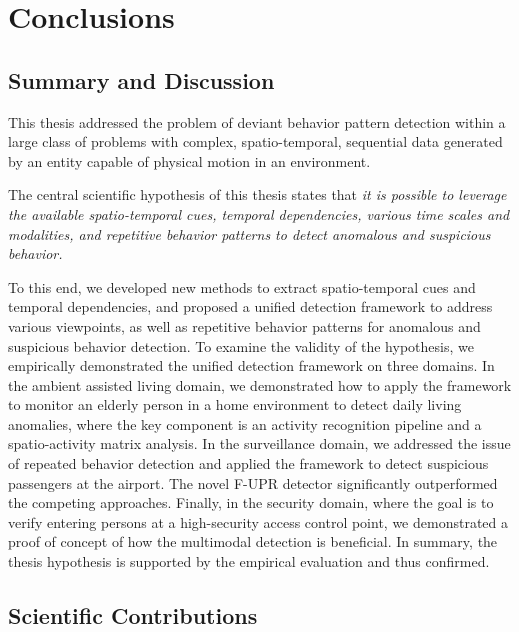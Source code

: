 
\chapter{Conclusions}
\label{chap:conclusions}

\section{Summary and Discussion}
This thesis addressed the problem of deviant behavior pattern detection within a large class of problems with complex, spatio-temporal, sequential data generated by an entity capable of physical motion in an environment.

The central scientific hypothesis of this thesis states that \textit{it is possible to leverage the available spatio-temporal cues, temporal dependencies, various time scales and modalities, and repetitive behavior patterns to detect anomalous and suspicious behavior.}

To this end, we developed new methods to extract spatio-temporal cues and temporal dependencies, and proposed a unified detection framework to address various viewpoints, as well as repetitive behavior patterns for anomalous and suspicious behavior detection.
%
To examine the validity of the hypothesis, we empirically demonstrated the unified detection framework on three domains.
In the ambient assisted living domain, we demonstrated how to apply the framework to monitor an elderly person in a home environment to detect daily living anomalies, where the key component is an activity recognition pipeline and a spatio-activity matrix analysis. In the surveillance domain, we addressed the issue of repeated behavior detection and applied the framework to detect suspicious passengers at the airport. The novel F-UPR detector significantly outperformed the competing approaches. Finally, in the security domain, where the goal is to verify entering persons at a high-security access control point, we demonstrated a proof of concept of how the multimodal detection is beneficial. In summary, the thesis hypothesis is supported by the empirical evaluation and thus confirmed.%

\section{Scientific Contributions}

